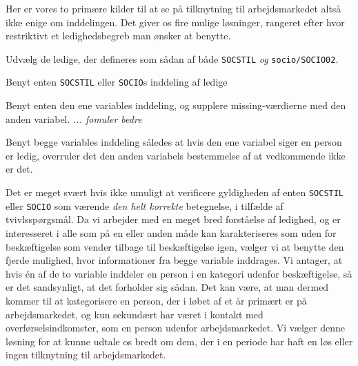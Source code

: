 Her er vores to primære kilder til at se på tilknytning til arbejdsmarkedet altså ikke enige om inddelingen. Det giver os fire mulige løsninger, rangeret efter hvor restriktivt et ledighedsbegreb man ønsker at benytte.
%
\begin{description} [topsep=6pt,itemsep=-1ex]
  \item[Restriktiv] Udvælg de ledige, der defineres som sådan af både \texttt{SOCSTIL} \emph{og} \texttt{socio/SOCIO02}.
  \item[Semirestriktiv] Benyt enten \texttt{SOCSTIL} eller \texttt{SOCIO}s inddeling af ledige
  \item[Semibred] Benyt enten den ene variables inddeling, og supplere missing-værdierne med den anden variabel. \emph{... fomuler bedre}
 \item[Bred] Benyt begge variables inddeling således at hvis den ene variabel siger en person er ledig, overruler det den anden variabels bestemmelse af at vedkommende ikke er det.
\end{description}
%
Det er meget svært hvis ikke umuligt at verificere gyldigheden af enten \texttt{SOCSTIL} eller \texttt{SOCIO} som værende \emph{den helt korrekte} betegnelse, i tilfælde af tvivlsspørgsmål. Da vi arbejder med en meget bred forståelse af ledighed, og er interesseret i alle som på en eller anden måde kan karakteriseres som uden for beskæftigelse som vender tilbage til beskæftigelse igen, vælger vi at benytte den fjerde mulighed, hvor informationer fra begge variable inddrages. Vi antager, at hvis én af de to variable inddeler en person i en kategori udenfor beskæftigelse, så er det sandsynligt, at det forholder sig sådan. Det kan være, at man dermed kommer til at kategorisere en person, der i løbet af et år primært er på arbejdsmarkedet, og kun sekundært har været i kontakt med overførselsindkomster, som en person udenfor arbejdsmarkedet. Vi vælger denne løsning for at kunne udtale os bredt om dem, der i en periode har haft en løs eller ingen tilknytning til arbejdsmarkedet. 

